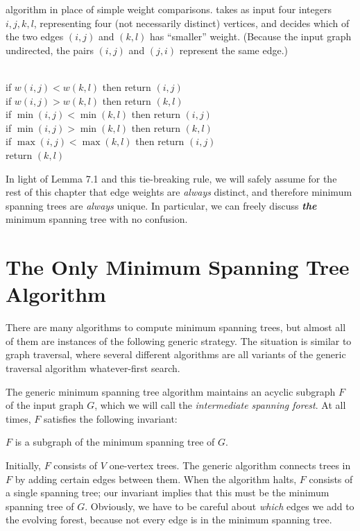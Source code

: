 algorithm in place of simple weight comparisons.  takes as input four integers $i, j, k, l$, representing four (not necessarily distinct) vertices, and decides which of the two edges $(i, j)$ and $(k, l)$ has “smaller” weight. (Because the input graph undirected, the pairs $(i, j)$ and $(j, i)$ represent the same edge.)

\begin{pseudocode}
\\
if $w(i, j) < w(k, l)$ then return $(i, j)$\\
if $w(i, j) > w(k, l)$ then return $(k, l)$\\
if $\min (i, j) < \min (k, l)$ then return $(i, j)$\\
if $\min (i, j) > \min (k, l)$ then return $(k, l)$\\
if $\max (i, j) < \max (k, l)$ then return $(i, j)$\\
 return $(k, l)$
\end{pseudocode}

In light of Lemma 7.1 and this tie-breaking rule, we will safely assume for the rest of this chapter that edge weights are \textit{always} distinct, and therefore minimum spanning trees are \textit{always} unique. In particular, we can freely discuss \textbf{\textit{the}} minimum spanning tree with no confusion.

\section{The Only Minimum Spanning Tree Algorithm}
\label{sec:7.2}

There are many algorithms to compute minimum spanning trees, but almost all of them are instances of the following generic strategy. The situation is similar to graph traversal, where several different algorithms are all variants of the generic traversal algorithm whatever-first search.

The generic minimum spanning tree algorithm maintains an acyclic subgraph $F$ of the input graph $G$, which we will call the \textit{intermediate spanning forest}. At all times, $F$ satisfies the following invariant:

\begin{problembox}
$F$ is a subgraph of the minimum spanning tree of $G$.
\end{problembox}

Initially, $F$ consists of $V$ one-vertex trees. The generic algorithm connects trees in $F$ by adding certain edges between them. When the algorithm halts, $F$ consists of a single spanning tree; our invariant implies that this must be the minimum spanning tree of $G$. Obviously, we have to be careful about \textit{which} edges we add to the evolving forest, because not every edge is in the minimum spanning tree.

